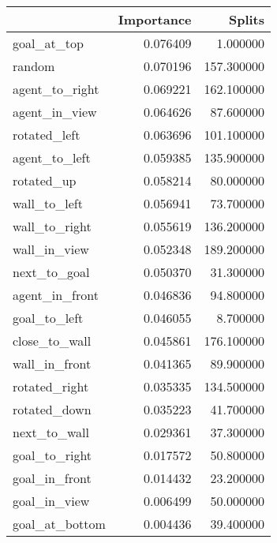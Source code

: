 \begin{tabular}{lrr}
\toprule
 & Importance & Splits \\
\midrule
goal\_at\_top & 0.076409 & 1.000000 \\
random & 0.070196 & 157.300000 \\
agent\_to\_right & 0.069221 & 162.100000 \\
agent\_in\_view & 0.064626 & 87.600000 \\
rotated\_left & 0.063696 & 101.100000 \\
agent\_to\_left & 0.059385 & 135.900000 \\
rotated\_up & 0.058214 & 80.000000 \\
wall\_to\_left & 0.056941 & 73.700000 \\
wall\_to\_right & 0.055619 & 136.200000 \\
wall\_in\_view & 0.052348 & 189.200000 \\
next\_to\_goal & 0.050370 & 31.300000 \\
agent\_in\_front & 0.046836 & 94.800000 \\
goal\_to\_left & 0.046055 & 8.700000 \\
close\_to\_wall & 0.045861 & 176.100000 \\
wall\_in\_front & 0.041365 & 89.900000 \\
rotated\_right & 0.035335 & 134.500000 \\
rotated\_down & 0.035223 & 41.700000 \\
next\_to\_wall & 0.029361 & 37.300000 \\
goal\_to\_right & 0.017572 & 50.800000 \\
goal\_in\_front & 0.014432 & 23.200000 \\
goal\_in\_view & 0.006499 & 50.000000 \\
goal\_at\_bottom & 0.004436 & 39.400000 \\
\bottomrule
\end{tabular}